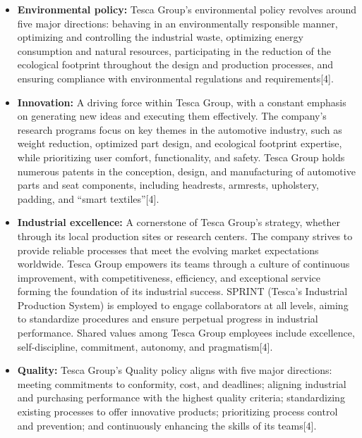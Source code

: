 \begin{itemize}

    \item \textbf{Environmental policy:} Tesca Group's environmental policy revolves around five major directions: behaving in an environmentally responsible manner, optimizing and controlling the industrial waste, optimizing energy consumption and natural resources, participating in the reduction of the ecological footprint throughout the design and production processes, and ensuring compliance with environmental regulations and requirements[4].

\end{itemize}


\begin{itemize}

    \item \textbf{Innovation:} A driving force within Tesca Group, with a constant emphasis on generating new ideas and executing them effectively. The company's research programs focus on key themes in the automotive industry, such as weight reduction, optimized part design, and ecological footprint expertise, while prioritizing user comfort, functionality, and safety. Tesca Group holds numerous patents in the conception, design, and manufacturing of automotive parts and seat components, including headrests, armrests, upholstery, padding, and ``smart textiles''[4].

\end{itemize}


\begin{itemize}

    \item \textbf{Industrial excellence:} A cornerstone of Tesca Group's strategy, whether through its local production sites or research centers. The company strives to provide reliable processes that meet the evolving market expectations worldwide. Tesca Group empowers its teams through a culture of continuous improvement, with competitiveness, efficiency, and exceptional service forming the foundation of its industrial success. SPRINT (Tesca's Industrial Production System) is employed to engage collaborators at all levels, aiming to standardize procedures and ensure perpetual progress in industrial performance. Shared values among Tesca Group employees include excellence, self-discipline, commitment, autonomy, and pragmatism[4].

\end{itemize}


\begin{itemize}

    \item \textbf{Quality:} Tesca Group's Quality policy aligns with five major directions: meeting commitments to conformity, cost, and deadlines; aligning industrial and purchasing performance with the highest quality criteria; standardizing existing processes to offer innovative products; prioritizing process control and prevention; and continuously enhancing the skills of its teams[4].

\end{itemize}



